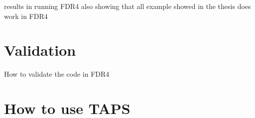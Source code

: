 results in running FDR4
also showing that all example showed in the thesis does work in FDR4


\section{Validation}
    How to validate the code in FDR4

\section{How to use TAPS}
